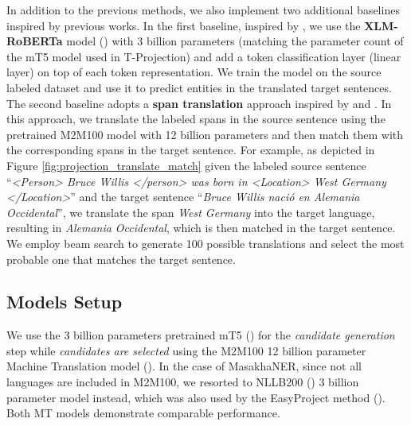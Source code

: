 In addition to the previous methods, we also implement two additional baselines inspired by previous works. In the first baseline, inspired by \citet{Li2021CrossLingualNE}, we use the \textbf{XLM-RoBERTa} model (\cite{conneau-etal-2020-unsupervised}) with 3 billion parameters (matching the parameter count of the mT5 model used in T-Projection) and add a token classification layer (linear layer) on top of each token representation. We train the model on the source labeled dataset and use it to predict entities in the translated target sentences.
The second baseline adopts a \textbf{span translation} approach inspired by \cite{DBLP:conf/emnlp/JainPL19} and \citet{DBLP:journals/corr/abs-2211-09394}. In this approach, we translate the labeled spans in the source sentence using the pretrained M2M100 model with 12 billion parameters and then match them with the corresponding spans in the target sentence. For example, as depicted in Figure \ref{fig:projection_translate_match} given the labeled source sentence ``\textit{<Person> Bruce Willis </person> was born in <Location> West Germany </Location>}'' and the target sentence ``\textit{Bruce Willis nació en Alemania Occidental}'', we translate the span \textit{West Germany} into the target language, resulting in \textit{Alemania Occidental}, which is then matched in the target sentence. We employ beam search to generate 100 possible translations and select the most probable one that matches the target sentence.


\subsection{Models Setup}

We use the 3 billion parameters pretrained mT5
(\cite{mt5}) for the \emph{candidate generation} step while \emph{candidates are selected} using the M2M100 12 billion parameter
Machine Translation model (\cite{JMLR:v22:20-1307}). In the case of MasakhaNER, since not all languages are included in M2M100, we resorted to NLLB200 (\cite{DBLP:journals/corr/abs-2207-04672}) 3 billion parameter model instead, which was also used by the EasyProject method (\cite{chen-etal-2023-frustratingly}). Both MT models demonstrate comparable performance. 

